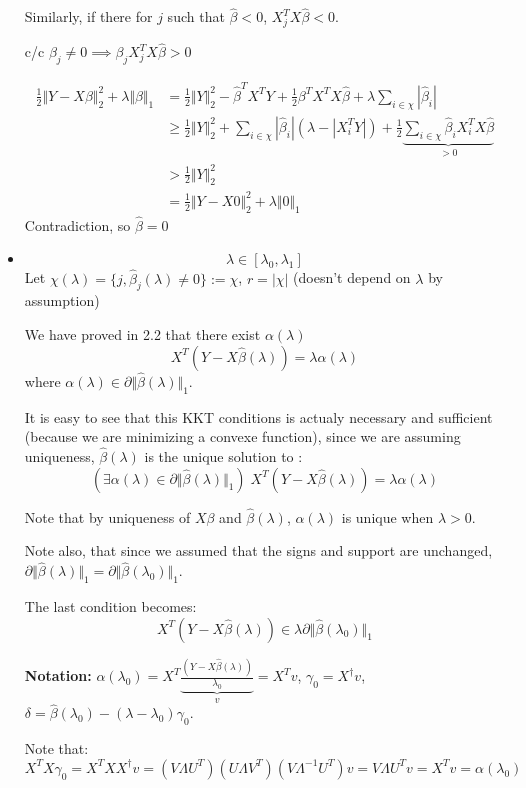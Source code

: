 \documentclass[12pt]{article}
\newcommand{\norm}[1]{\Vert #1 \Vert}
\begin{document}
\begin{itemize}
  Similarly, if there for $j$ such that $\hat \beta < 0$, $X_j^TX\hat \beta < 0$.
  
  c/c $\beta_j \ne 0 \implies \beta_j X_j^TX\hat \beta > 0$

  
  \begin{align*}
    \frac12 \norm{Y - X\beta}_2^2 + \lambda \norm{\beta}_1
    &= \frac12 \norm{Y}_2^2 - \hat \beta^TX^TY + \frac12 \beta^T X^TX \hat \beta +  \lambda \sum_{i \in \chi} |\hat \beta_i|
    \\&\ge \frac12 \norm{Y}_2^2 + \sum_{i \in \chi} |\hat \beta_i| (\lambda - |X_i^TY|)
        + \frac12  \underbrace{\sum_{i \in \chi} \hat\beta_i X_i^TX\hat \beta}_{> 0}
    \\&> \frac12 \norm{Y}_2^2
    \\&= \frac12 \norm{Y - X0}_2^2 + \lambda\norm{0}_1
  \end{align*}
  Contradiction, so $\hat \beta = 0$
\item
  $$\lambda \in [\lambda_0, \lambda_1]$$
  Let $\chi(\lambda) = \{ j, \hat \beta_j(\lambda) \ne 0 \} := \chi$, $r = |\chi|$ (doesn't depend on $\lambda$ by assumption)

  We have proved in 2.2 that there exist $\alpha(\lambda)$
  $$X^T(Y - X\hat \beta(\lambda)) = \lambda \alpha(\lambda) $$
  where $\alpha(\lambda) \in \partial \norm{\hat \beta(\lambda)}_1$.

  It is easy to see that this KKT conditions is actualy necessary and sufficient (because we are minimizing a convexe function), since we are assuming uniqueness, $\hat \beta(\lambda)$ is the unique solution to :
  $$(\exists \alpha(\lambda) \in \partial \norm{\hat \beta(\lambda)}_1) \; X^T(Y - X\hat \beta(\lambda)) = \lambda \alpha(\lambda) $$
  
  Note that by uniqueness of $X\beta$ and $\hat \beta(\lambda)$, $\alpha(\lambda)$ is unique when $\lambda > 0$.
  
  Note also, that since we assumed that the signs and support are unchanged, $\partial \norm{\hat \beta(\lambda)}_1 = \partial \norm{\hat \beta(\lambda_0)}_1$.
  
  The last condition becomes:
  $$X^T(Y - X\hat \beta(\lambda)) \in \lambda \partial \norm{\hat \beta(\lambda_0)}_1$$


  \textbf{Notation: } $ \alpha(\lambda_0) =  X^T \underbrace{\frac{(Y - X\hat \beta(\lambda))}{\lambda_0}}_v = X^Tv$,  $\gamma_0 = X^{\dagger} v$, $\delta = \hat \beta(\lambda_0) - (\lambda - \lambda_0) \gamma_0$. 

  Note that:
  $$X^TX\gamma_0 = X^T XX^{\dagger} v = (V \Lambda U^T) (U\Lambda V^T)  (V \Lambda^{-1} U^T) v = V \Lambda U^T v = X^T v = \alpha(\lambda_0)$$
  

\end{itemize}
\end{document}
